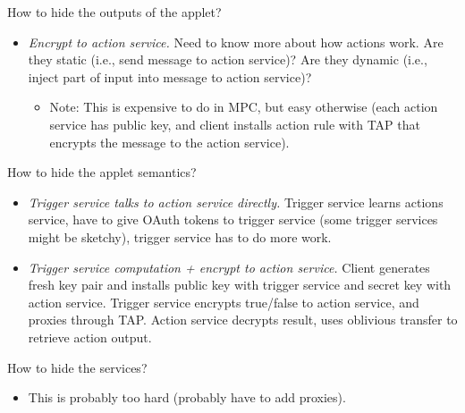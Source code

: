 How to hide the outputs of the applet?
\begin{itemize}[leftmargin=*]
  \item \emph{Encrypt to action service.} Need to know more about how actions
    work. Are they static (i.e., send message to action service)? Are they
    dynamic (i.e., inject part of input into message to action service)?
    \begin{itemize}
      \item Note: This is expensive to do in MPC, but easy otherwise (each
        action service has public key, and client installs action rule with TAP
        that encrypts the message to the action service).
    \end{itemize}
\end{itemize}\bigskip

How to hide the applet semantics?
\begin{itemize}[leftmargin=*]
  \item \emph{Trigger service talks to action service directly.} Trigger service
    learns actions service, have to give OAuth tokens to trigger service (some
    trigger services might be sketchy), trigger service has to do more work.
  \item \emph{Trigger service computation + encrypt to action service.}  Client
    generates fresh key pair and installs public key with trigger service and
    secret key with action service. Trigger service encrypts true/false to
    action service, and proxies through TAP. Action service decrypts result,
    uses oblivious transfer to retrieve action output.
\end{itemize}\bigskip

How to hide the services?
\begin{itemize}[leftmargin=*]
  \item This is probably too hard (probably have to add proxies).
\end{itemize}
